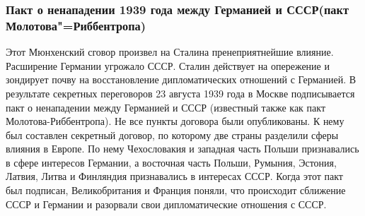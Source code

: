 \subsubsection{\textbf{Пакт о ненападении 1939 года между Германией и СССР(пакт Молотова"=Риббентропа)}}

Этот Мюнхенский сговор произвел на Сталина пренеприятнейшие влияние. Расширение Германии угрожало СССР. Сталин действует на опережение и зондирует почву на восстановление дипломатических отношений с Германией. В результате секретных переговоров 23 августа 1939 года в Москве подписывается пакт о ненападении между Германией и СССР (известный также как пакт Молотова-Риббентропа). Не все пункты договора были опубликованы. К нему был составлен секретный договор, по которому две страны разделили сферы влияния в Европе. По нему Чехословакия и западная часть Польши признавались в сфере интересов Германии, а восточная часть Польши, Румыния, Эстония, Латвия, Литва и Финляндия признавались в интересах СССР. Когда этот пакт был подписан, Великобритания и Франция поняли, что происходит сближение СССР и Германии и разорвали свои дипломатические отношения с СССР.

